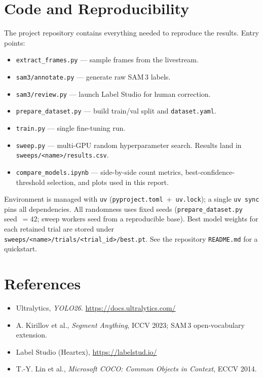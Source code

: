 \documentclass{article}
\begin{document}
\section*{Code and Reproducibility}
The project repository contains everything needed to reproduce
the results. Entry points:
\begin{itemize}[leftmargin=1.5em]
    \item \texttt{extract\_frames.py} --- sample frames from the
    livestream.
    \item \texttt{sam3/annotate.py} --- generate raw SAM\,3 labels.
    \item \texttt{sam3/review.py} --- launch Label Studio for
    human correction.
    \item \texttt{prepare\_dataset.py} --- build train/val split
    and \texttt{dataset.yaml}.
    \item \texttt{train.py} --- single fine-tuning run.
    \item \texttt{sweep.py} --- multi-GPU random hyperparameter
    search. Results land in \texttt{sweeps/<name>/results.csv}.
    \item \texttt{compare\_models.ipynb} --- side-by-side count
    metrics, best-confidence-threshold selection, and plots used
    in this report.
\end{itemize}
Environment is managed with \texttt{uv}
(\texttt{pyproject.toml}~+~\texttt{uv.lock}); a single
\texttt{uv sync} pins all dependencies. All randomness uses fixed
seeds (\texttt{prepare\_dataset.py} seed~$=42$; sweep workers
seed from a reproducible base). Best model weights for each
retained trial are stored under
\texttt{sweeps/<name>/trials/<trial\_id>/best.pt}. See the
repository \texttt{README.md} for a quickstart.

\section*{References}
\begin{itemize}[leftmargin=1.5em]
    \item Ultralytics, \emph{YOLO26}. \url{https://docs.ultralytics.com/}
    \item A. Kirillov et al., \emph{Segment Anything}, ICCV 2023; SAM\,3 open-vocabulary extension.
    \item Label Studio (Heartex), \url{https://labelstud.io/}
    \item T.-Y. Lin et al., \emph{Microsoft COCO: Common Objects in Context}, ECCV 2014.
\end{itemize}
\end{document}
